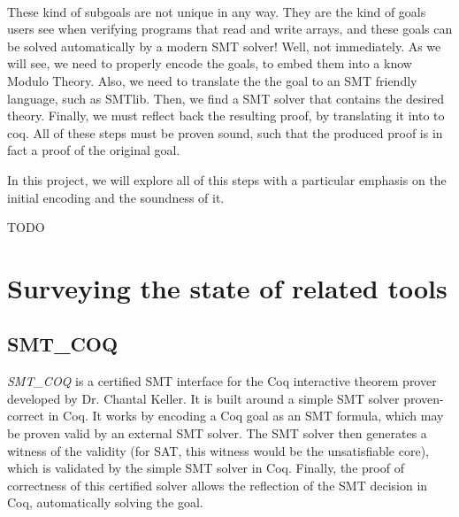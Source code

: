 \documentclass[onecolumn, preprint]{sigplanconf}
\begin{document}
\

These kind of subgoals are not unique in any way. They are the kind of goals users see when verifying programs that read and write arrays, and these goals can be solved automatically by a modern SMT solver! Well, not immediately. As we will see, we need to properly encode the goals, to embed them into a know Modulo Theory. Also, we need to translate the the goal to an SMT friendly language, such as SMTlib. Then, we find a SMT solver that contains the desired theory. Finally, we must reflect back the resulting proof, by translating it into to coq. All of these steps must be proven sound, such that the produced proof is in fact a proof of the original goal. %

In this project, we will explore all of this steps with a particular emphasis on the initial encoding and the soundness of it.






TODO





\section{Surveying the state of related tools}
\label{sec:survey}
\subsection{SMT\_COQ}
\emph{SMT\_COQ} is a certified SMT interface for the Coq interactive theorem prover developed by Dr. Chantal Keller. It is built around a simple SMT solver proven-correct in Coq.
It works by encoding a Coq goal as an SMT formula, which may be proven valid by an external SMT solver. The SMT solver then generates a witness of the validity (for SAT, this witness would be the unsatisfiable core), which is validated by the simple SMT solver in Coq. Finally, the proof of correctness of this certified solver allows the reflection of the SMT decision in Coq, automatically solving the goal.
\end{document}
